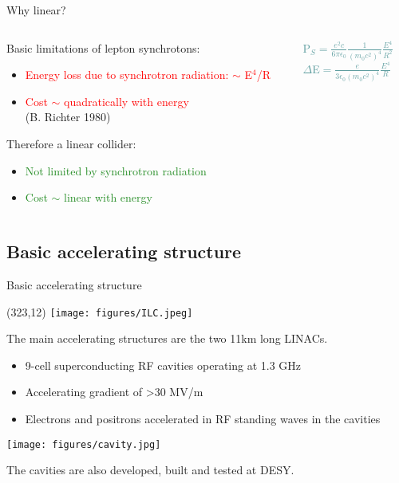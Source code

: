 \documentclass[xcolor={dvipsnames}]{beamer}
\newcommand{\ilclogo}{
  \setlength{\TPHorizModule}{1pt}
  \setlength{\TPVertModule}{1pt}
  \begin{textblock}{1}(323,12)
   \texttt{[image: figures/ILC.jpeg]}
  \end{textblock}
}
\begin{document}
\begin{frame}{Why linear?}
\begin{columns}
 \begin{column}{0.6\textwidth}
  Basic limitations of lepton synchrotons:
\begin{itemize}
 \item \textcolor{Red}{Energy loss due to synchrotron radiation: $\sim$ E$^4$/R}
 \item \textcolor{Red}{Cost $\sim$ quadratically with energy}\\ \tiny{(B. Richter 
1980)}
\end{itemize}
\vspace*{1cm}
Therefore a linear collider:
\begin{itemize}
 \item \textcolor{ForestGreen}{Not limited by synchrotron radiation}
 \item \textcolor{ForestGreen}{Cost $\sim$ linear with energy}
\end{itemize}
 \end{column}
 \begin{column}{0.4\textwidth}
 \begin{block}{}
  \begin{center}
      \textcolor{CadetBlue}{P$_S=\frac{e^2c}{6\pi\epsilon_0}\frac{1}{(m_0c^2)^4}\frac{E^4}{R^2}$\\
  $\Delta$E$=\frac{e}{3\epsilon_0(m_0c^2)^4}\frac{E^4}{R}$}
   \end{center}
 \end{block}
 \end{column}
\end{columns}

\end{frame}

\subsection{Basic accelerating structure}
\begin{frame}{Basic accelerating structure}
\ilclogo
The main accelerating structures are the two 11km long LINACs.
\begin{itemize}
\item 9-cell superconducting RF cavities operating at 1.3 GHz 
\item Accelerating gradient of >30 MV/m
\item Electrons and positrons accelerated in RF standing waves in the cavities 
\end{itemize}
\begin{center}
\texttt{[image: figures/cavity.jpg]}
\end{center}
The cavities are also developed, built and tested at DESY.
\end{frame}
\end{document}
